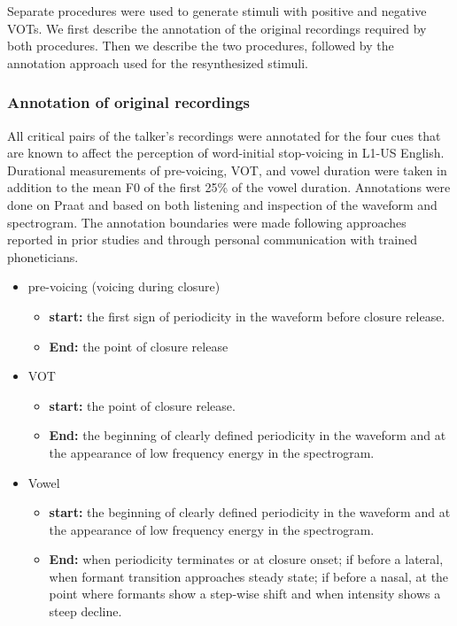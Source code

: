\documentclass[
  11pt,
  man,mask,floatsintext]{apa6}
\providecommand{\tightlist}{%
  \setlength{\itemsep}{0pt}\setlength{\parskip}{0pt}}
\begin{document}
Separate procedures were used to generate stimuli with positive and negative VOTs. We first describe the annotation of the original recordings required by both procedures. Then we describe the two procedures, followed by the annotation approach used for the resynthesized stimuli.

\subsubsection{Annotation of original recordings}\label{annotation-of-original-recordings}

All critical pairs of the talker's recordings were annotated for the four cues that are known to affect the perception of word-initial stop-voicing in L1-US English. Durational measurements of pre-voicing, VOT, and vowel duration were taken in addition to the mean F0 of the first 25\% of the vowel duration. Annotations were done on Praat and based on both listening and inspection of the waveform and spectrogram. The annotation boundaries were made following approaches reported in prior studies \autocites[e.g.][]{francis2003,kirby-ladd2016,dmitrieva2015,clayards2017} and through personal communication with trained phoneticians.

\begin{itemize}
\tightlist
\item
  pre-voicing (voicing during closure)

  \begin{itemize}
  \tightlist
  \item
    \textbf{start:} the first sign of periodicity in the waveform before closure release.
  \item
    \textbf{End:} the point of closure release
  \end{itemize}
\item
  VOT

  \begin{itemize}
  \tightlist
  \item
    \textbf{start:} the point of closure release.
  \item
    \textbf{End:} the beginning of clearly defined periodicity in the waveform and at the appearance of low frequency energy in the spectrogram.
  \end{itemize}
\item
  Vowel

  \begin{itemize}
  \tightlist
  \item
    \textbf{start:} the beginning of clearly defined periodicity in the waveform and at the appearance of low frequency energy in the spectrogram.
  \item
    \textbf{End:} when periodicity terminates or at closure onset; if before a lateral, when formant transition approaches steady state; if before a nasal, at the point where formants show a step-wise shift and when intensity shows a steep decline.
  \end{itemize}
\end{itemize}
\end{document}
